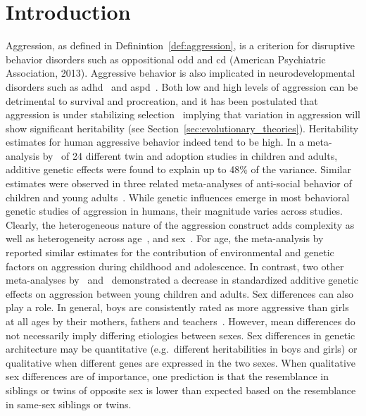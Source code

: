 \section{Introduction}
Aggression, as defined in Definintion~\ref{def:aggression}, is a criterion for disruptive behavior disorders such as oppositional \acrfull{odd} and \acrfull{cd} (American Psychiatric Association, 2013).
Aggressive behavior is also implicated in neurodevelopmental disorders such as \acrfull{adhd}~\cite{Hamshere2013, Monuteaux2009} and \acrfull{aspd}~\cite{Nouvion2007, Schaeffer2003}.
Both low and high levels of aggression can be detrimental to survival and procreation, and it has been postulated that aggression is under stabilizing selection~\cite{Anholt2012} implying that variation in aggression will show significant heritability (see Section~\ref{sec:evolutionary_theories}).
Heritability estimates for human aggressive behavior indeed tend to be high.
In a meta-analysis by~\citet{Miles1997} of 24 different twin and adoption studies in children and adults, additive genetic effects were found to explain up to 48\% of the variance.
Similar estimates were observed in three related meta-analyses of anti-social behavior of children and young adults~\cite{Ferguson2010, Mason1994, Rhee2002}. 
While genetic influences emerge in most behavioral genetic studies of aggression in humans, their magnitude varies across studies.
Clearly, the heterogeneous nature of the aggression construct adds complexity as well as heterogeneity across age~\cite{Rhee2002}, and sex~\cite{Vierikko2003}.
For age, the meta-analysis by~\citet{Miles1997} reported similar estimates for the contribution of environmental and genetic factors on aggression during childhood and adolescence.
In contrast, two other meta-analyses by~\citet{Ferguson2010} and~\citet{Rhee2002} demonstrated a decrease in standardized additive genetic effects on aggression between young children and adults. 
Sex differences can also play a role.
In general, boys are consistently rated as more aggressive than girls at all ages by their mothers, fathers and teachers~\cite{Hudziak2003}.
However, mean differences do not necessarily imply differing etiologies between sexes.
Sex differences in genetic architecture may be quantitative (e.g.\ different heritabilities in boys and girls) or qualitative when different genes are expressed in the two sexes.
When qualitative sex differences are of importance, one prediction is that the resemblance in siblings or twins of opposite sex is lower than expected based on the resemblance in same-sex siblings or twins.
